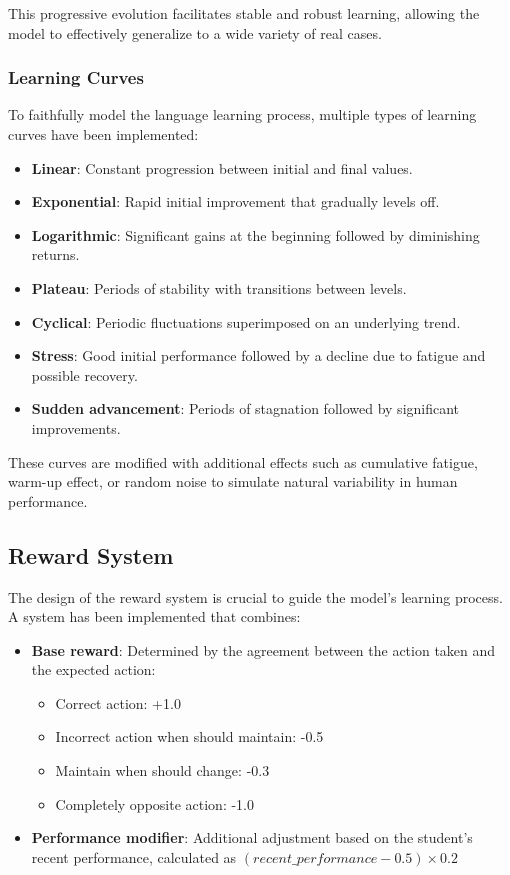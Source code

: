 This progressive evolution facilitates stable and robust learning, allowing the model to effectively generalize to a wide variety of real cases.


\subsubsection{Learning Curves}
\label{curvas-aprendizaje}

To faithfully model the language learning process, multiple types of learning curves have been implemented:

\begin{itemize}
    \item \textbf{Linear}: Constant progression between initial and final values.
    \item \textbf{Exponential}: Rapid initial improvement that gradually levels off.
    \item \textbf{Logarithmic}: Significant gains at the beginning followed by diminishing returns.
    \item \textbf{Plateau}: Periods of stability with transitions between levels.
    \item \textbf{Cyclical}: Periodic fluctuations superimposed on an underlying trend.
    \item \textbf{Stress}: Good initial performance followed by a decline due to fatigue and possible recovery.
    \item \textbf{Sudden advancement}: Periods of stagnation followed by significant improvements.
\end{itemize}

These curves are modified with additional effects such as cumulative fatigue, warm-up effect, or random noise to simulate natural variability in human performance.

\subsection{Reward System}
\label{sistema-recompensas-ppo}

The design of the reward system is crucial to guide the model's learning process. A system has been implemented that combines:

\begin{itemize}
    \item \textbf{Base reward}: Determined by the agreement between the action taken and the expected action:
    \begin{itemize}
        \item Correct action: +1.0
        \item Incorrect action when should maintain: -0.5
        \item Maintain when should change: -0.3
        \item Completely opposite action: -1.0
    \end{itemize}
    
    \item \textbf{Performance modifier}: Additional adjustment based on the student's recent performance, calculated as $(recent\_performance - 0.5) \times 0.2$
\end{itemize}

